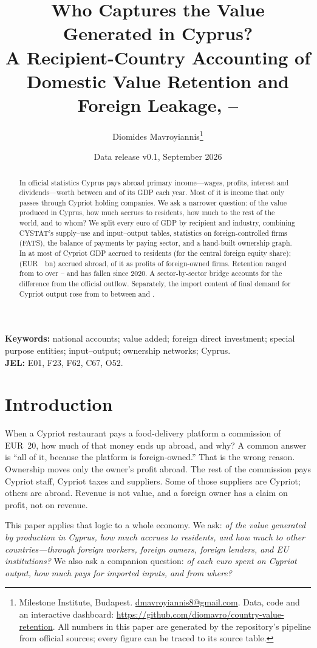 \documentclass[11pt]{article}
\title{Who Captures the Value Generated in Cyprus?\\[4pt]
\large A Recipient-Country Accounting of Domestic Value Retention and Foreign Leakage, \FirstYear--\LastYear}
\author{Diomides Mavroyiannis\thanks{Milestone Institute, Budapest. \href{mailto:dmavroyiannis8@gmail.com}{dmavroyiannis8@gmail.com}. Data, code and an interactive dashboard: \url{https://github.com/diomavro/country-value-retention}. All numbers in this paper are generated by the repository's pipeline from official sources; every figure can be traced to its source table.}}
\date{Data release v0.1, September 2026}
\newcommand{\EUR}{EUR~}
\begin{document}
\maketitle

\begin{abstract}
\noindent
In official statistics Cyprus pays abroad primary income---wages, profits, interest and dividends---worth between \OfficialOutMin{} and \OfficialOutMax{} of its GDP each year.
Most of it is income that only passes through Cypriot holding companies.
We ask a narrower question: of the value produced in Cyprus, how much accrues to residents, how much to the rest of the world, and to whom?
We split every euro of GDP by recipient and industry, combining CYSTAT's supply--use and input--output tables, statistics on foreign-controlled firms (FATS), the balance of payments by paying sector, and a hand-built ownership graph.
In \LastYear{} at most \DVRLast{} of Cypriot GDP accrued to residents (for the central foreign equity share); \FVLLast{} (\EUR\FVLLastEUR~bn) accrued abroad, \MechFDIShare{} of it as profits of foreign-owned firms.
Retention ranged from \DVRMin{} to \DVRMax{} over \FirstYear--\LastYear{} and has fallen since 2020.
A sector-by-sector bridge accounts for the difference from the official outflow.
Separately, the import content of final demand for Cypriot output rose from \TICFirst{} to \TICLast{} between \FirstYear{} and \IOLastYear{}.
\end{abstract}

\medskip
\noindent\textbf{Keywords:} national accounts; value added; foreign direct investment; special purpose entities; input--output; ownership networks; Cyprus.\\
\textbf{JEL:} E01, F23, F62, C67, O52.

\section{Introduction}
\label{sec:intro}

When a Cypriot restaurant pays a food-delivery platform a commission of \EUR20, how much of that money ends up abroad, and why?
A common answer is ``all of it, because the platform is foreign-owned.''
That is the wrong reason.
Ownership moves only the owner's profit abroad.
The rest of the commission pays Cypriot staff, Cypriot taxes and suppliers.
Some of those suppliers are Cypriot; others are abroad.
Revenue is not value, and a foreign owner has a claim on profit, not on revenue.

This paper applies that logic to a whole economy.
We ask: \emph{of the value generated by production in Cyprus, how much accrues to residents, and how much to other countries---through foreign workers, foreign owners, foreign lenders, and EU institutions?}
We also ask a companion question: \emph{of each euro spent on Cypriot output, how much pays for imported inputs, and from where?}
\end{document}
